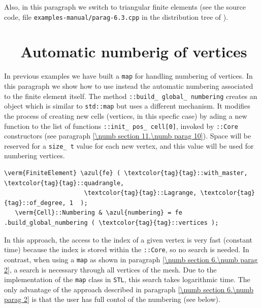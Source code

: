 Also, in this paragraph we switch to triangular finite elements (see the source code,
file {\small\tt examples-manual/parag-6.3.cpp} in the distribution tree of \maniFEM).


\section{~~Automatic numberig of vertices}\label{\numb section 6.\numb parag 4}

In previous examples we have built a {\small\tt map} for handling numbering of vertices.
In this paragraph we show how to use instead the automatic numbering associated to the
finite element itself.
The method {\small\tt{}::build\_\,global\_\,numbering} creates
an object which is similar to {\small\tt std::map} but uses a different mechanism.
It modifies the process of creating new cells (vertices, in this specfic case)
by ading a new function to the list of functions
{\small\tt{}::init\_\,pos\_\,cell[0]},
invoked by {\small\tt{}::Core} constructors
(see paragraph \ref{\numb section 11.\numb parag 10}).
Space will be reserved for a {\small\tt size\_\,t} value for each new vertex, and
this value will be used for numbering vertices.

\begin{Verbatim}[commandchars=\\\{\},formatcom=\small\tt,frame=single,
   label=parag-\ref{\numb section 6.\numb parag 4}.cpp,rulecolor=\color{coment},
   baselinestretch=0.94,framesep=2mm                                            ]
   \verm{FiniteElement} \azul{fe} ( \textcolor{tag}{tag}::with_master, \textcolor{tag}{tag}::quadrangle,
                      \textcolor{tag}{tag}::Lagrange, \textcolor{tag}{tag}::of_degree, 1  );
   \verm{Cell}::Numbering & \azul{numbering} = fe .build_global_numbering ( \textcolor{tag}{tag}::vertices );
\end{Verbatim}

In this approach, the access to the index of a given vertex is very fast (constant time)
because the index is stored within the {\small\tt{}::Core}, so no search is needed.
In contrast, when using a {\small\tt map} as shown in paragraph
\ref{\numb section 6.\numb parag 2}, a search is necessary through all vertices of the mesh.
Due to the implementation of the {\small\tt map} class in {\tt STL}, this search takes
logarithmic time.
The only advantage of the approach described in paragraph \ref{\numb section 6.\numb parag 2}
is that the user has full contol of the numbering (see below).

